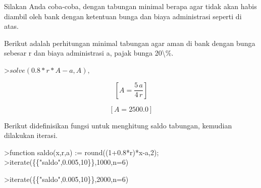 \documentclass[12pt,Times new roman,letterpaper]{book}
\begin{document}
\begin{eulernootebook}
\begin{eulercomment}
\begin{eulercomment}
\begin{eulernootebook}
\begin{eulercomment}
\begin{eulercomment}
\begin{eulercomment}
\begin{eulercomment}
\begin{eulercomment}
\begin{eulercomment}
\begin{eulernotebook}
\begin{eulercomment}
\begin{eulercomment}
\begin{eulercomment}
\begin{eulercomment}
\begin{eulercomment}
\begin{eulercomment}
\begin{eulercomment}
\begin{eulercomment}
\begin{eulercomment}
\begin{eulercomment}
\begin{eulercomment}
\begin{eulercomment}
\begin{eulercomment}
\begin{eulercomment}
\begin{eulercomment}
\begin{eulercomment}
\begin{eulercomment}
\begin{eulercomment}
\begin{eulercomment}
\begin{eulercomment}
\begin{eulercomment}
\begin{eulercomment}
\begin{eulercomment}
\begin{eulercomment}
\begin{eulercomment}
\begin{eulercomment}
\begin{eulercomment}
Silakan Anda coba-coba, dengan tabungan minimal berapa agar tidak akan
habis diambil oleh bank dengan ketentuan bunga dan biaya administrasi
seperti di atas.

Berikut adalah perhitungan minimal tabungan agar aman di bank dengan
bunga sebesar r dan biaya administrasi a, pajak bunga 20\textbackslash{}\%.
\end{eulercomment}
\begin{eulerprompt}
>$solve(0.8*r*A-a,A), $%
\end{eulerprompt}
\begin{eulerformula}
\[
\left[ A=\frac{5\,a}{4\,r} \right] 
\]
\end{eulerformula}
\begin{eulerformula}
\[
\left[ A=2500.0 \right] 
\]
\end{eulerformula}
\begin{eulercomment}
Berikut didefinisikan fungsi untuk menghitung saldo tabungan, kemudian
dilakukan iterasi.
\end{eulercomment}
\begin{eulerprompt}
>function saldo(x,r,a) := round((1+0.8*r)*x-a,2);
>iterate(\{\{"saldo",0.005,10\}\},1000,n=6)
\end{eulerprompt}
\begin{euleroutput}
  [1000,  994,  987.98,  981.93,  975.86,  969.76,  963.64]
\end{euleroutput}
\begin{eulerprompt}
>iterate(\{\{"saldo",0.005,10\}\},2000,n=6)
\end{eulerprompt}
\begin{euleroutput}
  [2000,  1998,  1995.99,  1993.97,  1991.95,  1989.92,  1987.88]
\end{euleroutput}

\end{eulercomment}
\end{eulercomment}
\end{eulercomment}
\end{eulercomment}
\end{eulercomment}
\end{eulercomment}
\end{eulercomment}
\end{eulercomment}
\end{eulercomment}
\end{eulercomment}
\end{eulercomment}
\end{eulercomment}
\end{eulercomment}
\end{eulercomment}
\end{eulercomment}
\end{eulercomment}
\end{eulercomment}
\end{eulercomment}
\end{eulercomment}
\end{eulercomment}
\end{eulercomment}
\end{eulercomment}
\end{eulercomment}
\end{eulercomment}
\end{eulercomment}
\end{eulercomment}
\end{eulernotebook}
\end{eulercomment}
\end{eulercomment}
\end{eulercomment}
\end{eulercomment}
\end{eulercomment}
\end{eulercomment}
\end{eulernootebook}
\end{eulercomment}
\end{eulercomment}
\end{eulernootebook}
\end{document}

